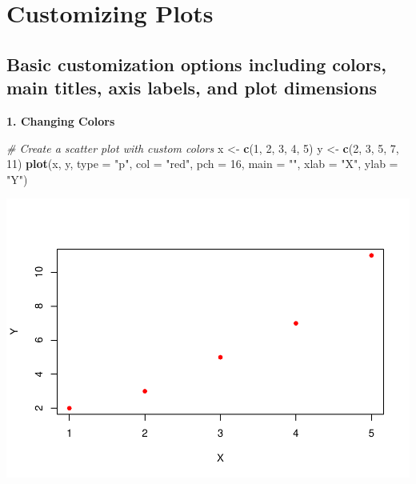 \documentclass[
]{book}
\newenvironment{Shaded}{\begin{snugshade}}{\end{snugshade}}
\newcommand{\AttributeTok}[1]{\textcolor[rgb]{0.13,0.29,0.53}{#1}}
\newcommand{\CommentTok}[1]{\textcolor[rgb]{0.56,0.35,0.01}{\textit{#1}}}
\newcommand{\DecValTok}[1]{\textcolor[rgb]{0.00,0.00,0.81}{#1}}
\newcommand{\FunctionTok}[1]{\textcolor[rgb]{0.13,0.29,0.53}{\textbf{#1}}}
\newcommand{\NormalTok}[1]{#1}
\newcommand{\OtherTok}[1]{\textcolor[rgb]{0.56,0.35,0.01}{#1}}
\newcommand{\StringTok}[1]{\textcolor[rgb]{0.31,0.60,0.02}{#1}}
\begin{document}
\section{Customizing Plots}\label{customizing-plots}

\subsection{Basic customization options including colors, main titles, axis labels, and plot dimensions}\label{basic-customization-options-including-colors-main-titles-axis-labels-and-plot-dimensions}

\textbf{1. Changing Colors}

\begin{Shaded}
\begin{Highlighting}[]
\CommentTok{\# Create a scatter plot with custom colors}
\NormalTok{x }\OtherTok{\textless{}{-}} \FunctionTok{c}\NormalTok{(}\DecValTok{1}\NormalTok{, }\DecValTok{2}\NormalTok{, }\DecValTok{3}\NormalTok{, }\DecValTok{4}\NormalTok{, }\DecValTok{5}\NormalTok{)}
\NormalTok{y }\OtherTok{\textless{}{-}} \FunctionTok{c}\NormalTok{(}\DecValTok{2}\NormalTok{, }\DecValTok{3}\NormalTok{, }\DecValTok{5}\NormalTok{, }\DecValTok{7}\NormalTok{, }\DecValTok{11}\NormalTok{)}
\FunctionTok{plot}\NormalTok{(x, y, }\AttributeTok{type =} \StringTok{"p"}\NormalTok{, }\AttributeTok{col =} \StringTok{"red"}\NormalTok{, }\AttributeTok{pch =} \DecValTok{16}\NormalTok{, }\AttributeTok{main =} \StringTok{""}\NormalTok{, }\AttributeTok{xlab =} \StringTok{"X"}\NormalTok{, }\AttributeTok{ylab =} \StringTok{"Y"}\NormalTok{)}
\end{Highlighting}
\end{Shaded}

\includegraphics{_main_files/figure-latex/unnamed-chunk-32-1.pdf}
\end{document}
